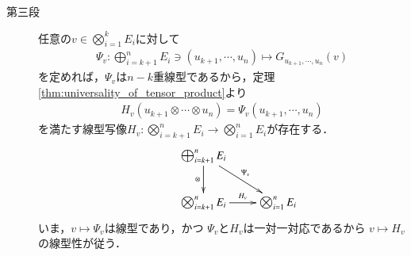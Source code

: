 \begin{prf}
\begin{description}
			\item[第三段]
				任意の$v \in \bigotimes_{i=1}^k E_i$に対して
				\begin{align}
					\Psi_v: \bigoplus_{i=k+1}^n E_i
					\ni (u_{k+1},\cdots,u_n)
					\longmapsto G_{u_{k+1},\cdots,u_n}(v)
				\end{align}
				を定めれば，$\Psi_v$は$n-k$重線型であるから，定理\ref{thm:universality_of_tensor_product}より
				\begin{align}
					H_v(u_{k+1} \otimes \cdots \otimes u_n)
					= \Psi_v(u_{k+1},\cdots,u_n)
				\end{align}
				を満たす線型写像$H_v:\bigotimes_{i=k+1}^n E_i \longrightarrow 
				\bigotimes_{i=1}^n E_i$が存在する．
				\begin{align}
					\xymatrix{
						&\bigoplus_{i=k+1}^n E_i \ar[d]_-\otimes \ar[rd]^-{\Psi_v} & \\
						&\bigotimes_{i=k+1}^n E_i \ar[r]^-{H_v} & \bigotimes_{i=1}^n E_i
					}
				\end{align}
				いま，$v \longmapsto \Psi_v$は線型であり，かつ
				$\Psi_v$と$H_v$は一対一対応であるから
				$v \longmapsto H_v$の線型性が従う．
				

\end{description}
\end{prf}
